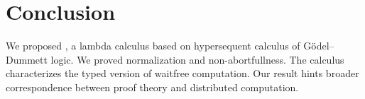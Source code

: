 \section{Conclusion}
\label{conc}
We proposed \lgd, a lambda calculus
based on hypersequent calculus of
G\"odel--Dummett logic.
We proved normalization and non-abortfullness.
The calculus characterizes
the typed version of waitfree computation.
Our result hints broader correspondence between proof theory and distributed computation.

\renewcommand{\comodL}{\comod{c}{\co c}}
\renewcommand{\comodR}{\comod{\co c}{c}}
